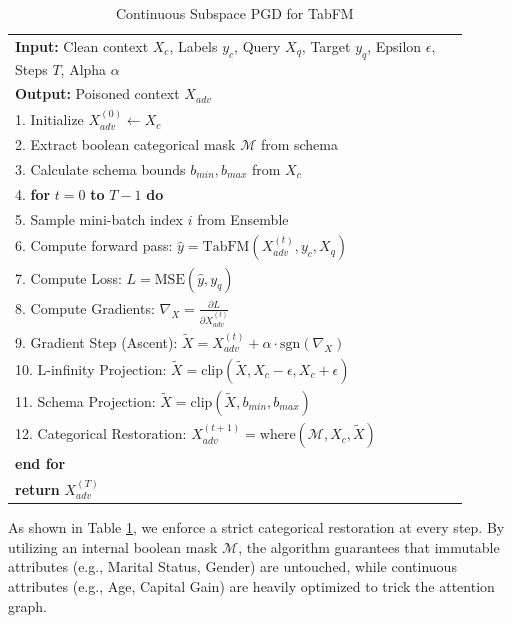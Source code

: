\begin{table}[h]
\centering
\caption{Continuous Subspace PGD for TabFM}
\label{alg:pgd}
\begin{tabular}{p{0.9\linewidth}}
\toprule
\textbf{Input:} Clean context $X_c$, Labels $y_c$, Query $X_q$, Target $y_q$, Epsilon $\epsilon$, Steps $T$, Alpha $\alpha$ \\
\textbf{Output:} Poisoned context $X_{adv}$ \\
\midrule
1. Initialize $X_{adv}^{(0)} \leftarrow X_c$ \\
2. Extract boolean categorical mask $\mathcal{M}$ from schema \\
3. Calculate schema bounds $b_{min}, b_{max}$ from $X_c$ \\
4. \textbf{for} $t = 0$ \textbf{to} $T-1$ \textbf{do} \\
\hspace{0.5cm} 5. Sample mini-batch index $i$ from Ensemble \\
\hspace{0.5cm} 6. Compute forward pass: $\hat{y} = \text{TabFM}(X_{adv}^{(t)}, y_c, X_q)$ \\
\hspace{0.5cm} 7. Compute Loss: $L = \text{MSE}(\hat{y}, y_q)$ \\
\hspace{0.5cm} 8. Compute Gradients: $\nabla_X = \frac{\partial L}{\partial X_{adv}^{(t)}}$ \\
\hspace{0.5cm} 9. Gradient Step (Ascent): $\tilde{X} = X_{adv}^{(t)} + \alpha \cdot \text{sgn}(\nabla_X)$ \\
\hspace{0.5cm} 10. L-infinity Projection: $\tilde{X} = \text{clip}(\tilde{X}, X_c - \epsilon, X_c + \epsilon)$ \\
\hspace{0.5cm} 11. Schema Projection: $\tilde{X} = \text{clip}(\tilde{X}, b_{min}, b_{max})$ \\
\hspace{0.5cm} 12. Categorical Restoration: $X_{adv}^{(t+1)} = \text{where}(\mathcal{M}, X_c, \tilde{X})$ \\
\textbf{end for} \\
\midrule
\textbf{return} $X_{adv}^{(T)}$ \\
\bottomrule
\end{tabular}
\end{table}

As shown in Table \ref{alg:pgd}, we enforce a strict categorical restoration at every step. By utilizing an internal boolean mask $\mathcal{M}$, the algorithm guarantees that immutable attributes (e.g., Marital Status, Gender) are untouched, while continuous attributes (e.g., Age, Capital Gain) are heavily optimized to trick the attention graph.

